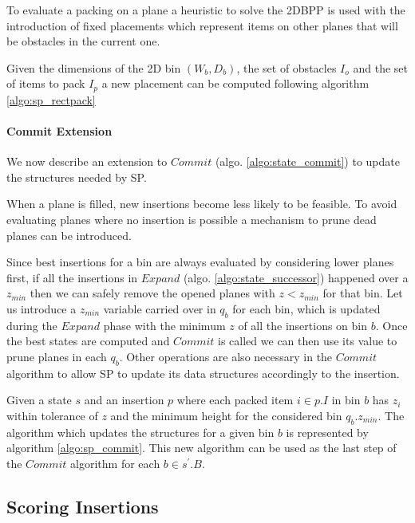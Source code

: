 

To evaluate a packing on a plane a heuristic to solve the 2DBPP is used with the introduction of fixed placements which represent items on other planes that will be obstacles in the current one.


Given the dimensions of the 2D bin $(W_b, D_b)$, the set of obstacles $I_{o}$ and the set of items to pack $I_{p}$ a new placement can be computed following algorithm \ref{algo:sp_rectpack}



\paragraph*{Commit Extension}
We now describe an extension to $Commit$ (algo. \ref{algo:state_commit}) to update the structures needed by SP.

When a plane is filled, new insertions become less likely to be feasible. 
To avoid evaluating planes where no insertion is possible a mechanism to prune dead planes can be introduced.

Since best insertions for a bin are always evaluated by considering lower planes first, if all the insertions in $Expand$ (algo. \ref{algo:state_successor}) happened over a $z_{min}$ then we can safely remove the opened planes with $z < z_{min}$ for that bin.
Let us introduce a $z_{min}$ variable carried over in $q_b$ for each bin, which is updated during the $Expand$ phase with the minimum $z$ of all the insertions on bin $b$.
Once the best states are computed and $Commit$ is called we can then use its value to prune planes in each $q_b$.
Other operations are also necessary in the $Commit$ algorithm to allow SP to update its data structures accordingly to the insertion.

Given a state $s$ and an insertion $p$ where each packed item $i \in p.I$ in bin $b$ has $z_i$ within tolerance of $z$ and the minimum height for the considered bin $q_b.z_{min}$.
The algorithm which updates the structures for a given bin $b$ is represented by algorithm \ref{algo:sp_commit}.
This new algorithm can be used as the last step of the $Commit$ algorithm for each $b \in s^\prime.B$.



\subsection{Scoring Insertions}
\label{ssec:scoring_insertions}%